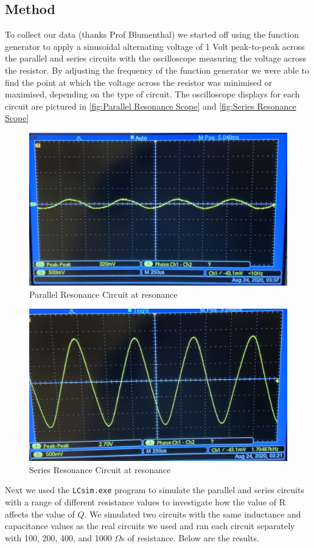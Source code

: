 \documentclass[12pt]{article}
\numberwithin{equation}{section}
\numberwithin{figure}{section}
\begin{document}
    \subsection{Method}
    To collect our data (thanks Prof Blumenthal) we started off using the function generator to apply 
    a sinusoidal alternating voltage of 1 Volt peak-to-peak across the parallel and series circuits 
    with the oscilloscope 
    measuring the voltage across the resistor. By adjusting the frequency of the function generator 
    we were able to find the point at which the voltage across the resistor was minimised or maximised, 
    depending on the type of circuit. The oscilloscope displays for each circuit are pictured 
    in \autoref{fig:Parallel Resonance Scope} and \autoref{fig:Series Resonance Scope}
    \begin{figure}[h]
        \begin{center}
           \includegraphics[width=.65\textwidth]{Parallel_Resonance_Scope.jpg}
           \caption{Parallel Resonance Circuit at resonance}
           \label{fig:Parallel Resonance Scope}
        \end{center}
    \end{figure}
    \begin{figure}[h]
        \begin{center}
           \includegraphics[width=.65\textwidth]{Series_Resonance_Scope.jpg}
           \caption{Series Resonance Circuit at resonance}
           \label{fig:Series Resonance Scope}
        \end{center}
    \end{figure}
    Next we used the \texttt{LCsim.exe} program to simulate the parallel and series circuits with 
    a range of different resistance values to investigate how the value of R affects the value of $Q$. 
    We simulated two circuits with the same inductance and capacitance values as the real circuits we 
    used and ran each circuit separately with 100, 200, 400, and 1000 $\Omega$s of resistance. Below 
    are the results.
    
    
    
\end{document}
